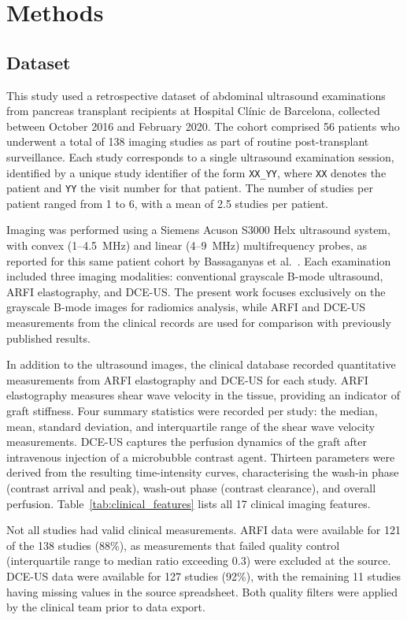 \chapter{Methods}

\section{Dataset}
\label{sec:dataset}

This study used a retrospective dataset of abdominal ultrasound examinations from pancreas transplant recipients at Hospital Cl\'{i}nic de Barcelona, collected between October 2016 and February 2020. The cohort comprised 56 patients who underwent a total of 138 imaging studies as part of routine post-transplant surveillance. Each study corresponds to a single ultrasound examination session, identified by a unique study identifier of the form \texttt{XX\_YY}, where \texttt{XX} denotes the patient and \texttt{YY} the visit number for that patient. The number of studies per patient ranged from 1 to 6, with a mean of 2.5 studies per patient.

Imaging was performed using a Siemens Acuson S3000 Helx ultrasound system, with convex (1--4.5~MHz) and linear (4--9~MHz) multifrequency probes, as reported for this same patient cohort by Bassaganyas et al.\ \cite{bassaganyas2025}. Each examination included three imaging modalities: conventional grayscale B-mode ultrasound, ARFI elastography, and DCE-US. The present work focuses exclusively on the grayscale B-mode images for radiomics analysis, while ARFI and DCE-US measurements from the clinical records are used for comparison with previously published results.

In addition to the ultrasound images, the clinical database recorded quantitative measurements from ARFI elastography and DCE-US for each study. ARFI elastography measures shear wave velocity in the tissue, providing an indicator of graft stiffness. Four summary statistics were recorded per study: the median, mean, standard deviation, and interquartile range of the shear wave velocity measurements. DCE-US captures the perfusion dynamics of the graft after intravenous injection of a microbubble contrast agent. Thirteen parameters were derived from the resulting time-intensity curves, characterising the wash-in phase (contrast arrival and peak), wash-out phase (contrast clearance), and overall perfusion. Table~\ref{tab:clinical_features} lists all 17 clinical imaging features.

Not all studies had valid clinical measurements. ARFI data were available for 121 of the 138 studies (88\%), as measurements that failed quality control (interquartile range to median ratio exceeding 0.3) were excluded at the source. DCE-US data were available for 127 studies (92\%), with the remaining 11 studies having missing values in the source spreadsheet. Both quality filters were applied by the clinical team prior to data export.

